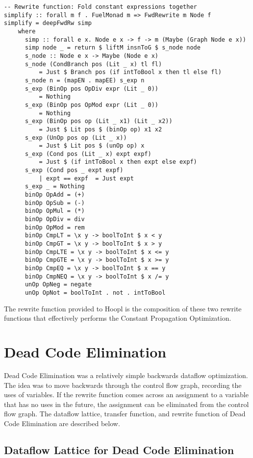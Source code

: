 \documentclass[11pt]{article}
\begin{document}
\begin{verbatim}
-- Rewrite function: Fold constant expressions together
simplify :: forall m f . FuelMonad m => FwdRewrite m Node f
simplify = deepFwdRw simp 
    where 
      simp :: forall e x. Node e x -> f -> m (Maybe (Graph Node e x))
      simp node _ = return $ liftM insnToG $ s_node node 
      s_node :: Node e x -> Maybe (Node e x)
      s_node (CondBranch pos (Lit _ x) tl fl) 
          = Just $ Branch pos (if intToBool x then tl else fl)
      s_node n = (mapEN . mapEE) s_exp n 
      s_exp (BinOp pos OpDiv expr (Lit _ 0)) 
          = Nothing
      s_exp (BinOp pos OpMod expr (Lit _ 0)) 
          = Nothing
      s_exp (BinOp pos op (Lit _ x1) (Lit _ x2)) 
          = Just $ Lit pos $ (binOp op) x1 x2
      s_exp (UnOp pos op (Lit _ x))
          = Just $ Lit pos $ (unOp op) x
      s_exp (Cond pos (Lit _ x) expt expf)
          = Just $ (if intToBool x then expt else expf)
      s_exp (Cond pos _ expt expf)
          | expt == expf  = Just expt
      s_exp _ = Nothing
      binOp OpAdd = (+)
      binOp OpSub = (-)
      binOp OpMul = (*)
      binOp OpDiv = div
      binOp OpMod = rem
      binOp CmpLT = \x y -> boolToInt $ x < y
      binOp CmpGT = \x y -> boolToInt $ x > y 
      binOp CmpLTE = \x y -> boolToInt $ x <= y 
      binOp CmpGTE = \x y -> boolToInt $ x >= y 
      binOp CmpEQ = \x y -> boolToInt $ x == y 
      binOp CmpNEQ = \x y -> boolToInt $ x /= y
      unOp OpNeg = negate 
      unOp OpNot = boolToInt . not . intToBool
\end{verbatim}

The rewrite function provided to Hoopl is the composition of these two rewrite functions that effectively performs the Constant Propagation Optimization. 

\section {Dead Code Elimination} 
\label{sec:deadcode}

Dead Code Elimination was a relatively simple backwards dataflow optimization. The idea was to move backwards through the control flow graph, recording the uses of variables. If the rewrite function comes across an assignment to a variable that has no uses in the future, the assignment can be eliminated from the control flow graph. The dataflow lattice, transfer function, and rewrite function of Dead Code Elimination are described below. 

\subsection { Dataflow Lattice for Dead Code Elimination }
\end{document}
